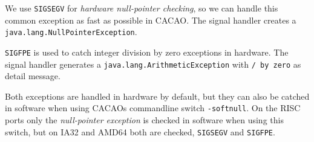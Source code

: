 We use \texttt{SIGSEGV} for \textit{hardware null-pointer checking},
so we can handle this common exception as fast as possible in
CACAO. The signal handler creates a
\texttt{java.lang.NullPointerException}.

\texttt{SIGFPE} is used to catch integer division by zero exceptions
in hardware. The signal handler generates a
\texttt{java.lang.ArithmeticException} with \texttt{/ by zero} as detail
message.

Both exceptions are handled in hardware by default, but they can also
be catched in software when using CACAOs commandline switch
\texttt{-softnull}. On the RISC ports only the \textit{null-pointer
exception} is checked in software when using this switch, but on IA32
and AMD64 both are checked, \texttt{SIGSEGV} and \texttt{SIGFPE}.
